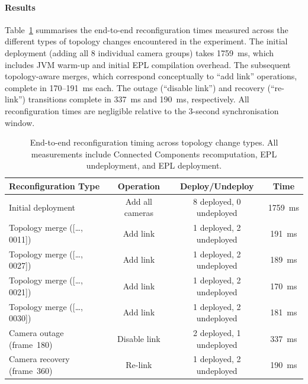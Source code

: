 \documentclass[review]{elsarticle}
\begin{document}
\paragraph{Results}
Table~\ref{tab:reconfiguration_timings} summarises the end-to-end reconfiguration times measured across the different types of topology changes encountered in the experiment. The initial deployment (adding all 8 individual camera groups) takes 1759~ms, which includes JVM warm-up and initial EPL compilation overhead. The subsequent topology-aware merges, which correspond conceptually to ``add link'' operations, complete in 170--191~ms each. The outage (``disable link'') and recovery (``re-link'') transitions complete in 337~ms and 190~ms, respectively. All reconfiguration times are negligible relative to the 3-second synchronisation window.

\begin{table}[H]
    \centering
    \caption{End-to-end reconfiguration timing across topology change types. All measurements include Connected Components recomputation, EPL undeployment, and EPL deployment.}
    \label{tab:reconfiguration_timings}
    \begin{tabular}{@{}lccc@{}}
        \toprule
        \textbf{Reconfiguration Type} & \textbf{Operation} & \textbf{Deploy/Undeploy} & \textbf{Time} \\ \midrule
        Initial deployment & Add all cameras & 8 deployed, 0 undeployed & 1759~ms \\
        Topology merge ([\ldots, 0011]) & Add link & 1 deployed, 2 undeployed & 191~ms \\
        Topology merge ([\ldots, 0027]) & Add link & 1 deployed, 2 undeployed & 189~ms \\
        Topology merge ([\ldots, 0021]) & Add link & 1 deployed, 2 undeployed & 170~ms \\
        Topology merge ([\ldots, 0030]) & Add link & 1 deployed, 2 undeployed & 181~ms \\
        Camera outage (frame~180) & Disable link & 2 deployed, 1 undeployed & 337~ms \\
        Camera recovery (frame~360) & Re-link & 1 deployed, 2 undeployed & 190~ms \\ \bottomrule
    \end{tabular}
\end{table}
\end{document}
